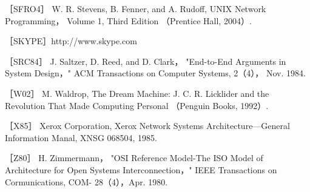 ［SFRO4］ W. R. Stevens, B. Fenner, and A. Rudoff, UNIX Network Programming，
Volume 1, Third Edition （Prentice Hall, 2004）.

［SKYPE］http://www.skype.com

［SRC84］ J. Saltzer, D. Reed, and D. Clark， "End-to-End Arguments in System
Design，" ACM Transactions on Computer Systems, 2（4）， Nov. 1984.

［W02］ M. Waldrop, The Dream Machine: J. C. R. Licklider and the Revolution That
Made Computing Personal （Penguin Books, 1992）.

［X85］ Xerox Corporation, Xerox Network Systems Architecture—General Information
Manal, XNSG 068504, 1985.

［Z80］ H. Zimmermann， "OSI Reference Model-The ISO Model of Architecture
for Open Systems Interconnection，" IEEE Transactions on Cormunications, COM-
28（4），Apr. 1980.
\fi